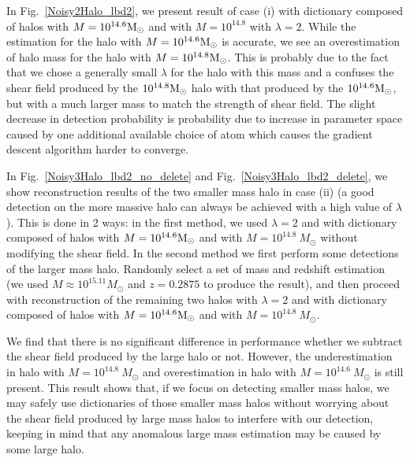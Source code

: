 \documentclass[twocolumn, usenames, dvipsnames]{aastex63}
\begin{document}
In Fig.~\ref{Noisy2Halo_lbd2}, we present result of case (i) with
dictionary composed of halos with $M = 10^{14.6}\textup{M}_\odot$ and with $M=
10^{14.8}$ with $\lambda=2$. While the estimation for the halo with $M =
10^{14.6}\textup{M}_\odot$ is accurate, we see an overestimation of halo mass
for the halo with $M = 10^{14.8}\textup{M}_\odot$. This is probably due to the
fact that we chose a generally small $\lambda$ for the halo with this mass and
a \splinv{} confuses the shear field produced by the
$10^{14.8}\textup{M}_\odot$ halo with that produced by the
$10^{14.6}\textup{M}_\odot$, but with a much larger mass to match the strength
of shear field. The slight decrease in detection probability is probability due
to increase in parameter space caused by one additional available choice of
atom which causes the gradient descent algorithm harder to converge.

In Fig.~\ref{Noisy3Halo_lbd2_no_delete} and Fig.~\ref{Noisy3Halo_lbd2_delete},
we show reconstruction results of the two smaller mass halo in case (ii) (a
good detection on the more massive halo can always be achieved with a high
value of $\lambda$). This is done in 2 ways: in the first method, we used
$\lambda=2$ and with dictionary composed of halos with $M =
10^{14.6}\textup{M}_\odot$ and with $M= 10^{14.8} ~M_\odot$ without modifying
the shear field. In the second method we first perform some detections of the
larger mass halo. Randomly select a set of mass and redshift estimation (we
used $M \approx 10^{15.11} M_\odot$ and $z=0.2875$ to produce the result), and
then proceed with reconstruction of the remaining two halos with $\lambda=2$
and with dictionary composed of halos with $M = 10^{14.6}\textup{M}_\odot$ and
with $M= 10^{14.8} ~M_\odot$.

We find that there is no significant difference in performance whether we
subtract the shear field produced by the large halo or not. However, the
underestimation in halo with $M=10^{14.8} ~M_\odot$ and overestimation in halo
with $M=10^{14.6}~M_\odot$ is still present. This result shows that, if we
focus on detecting smaller mass halos, we may safely use dictionaries of those
smaller mass halos without worrying about the shear field produced by large
mass halos to interfere with our detection, keeping in mind that any anomalous
large mass estimation may be caused by some large halo.
\end{document}

